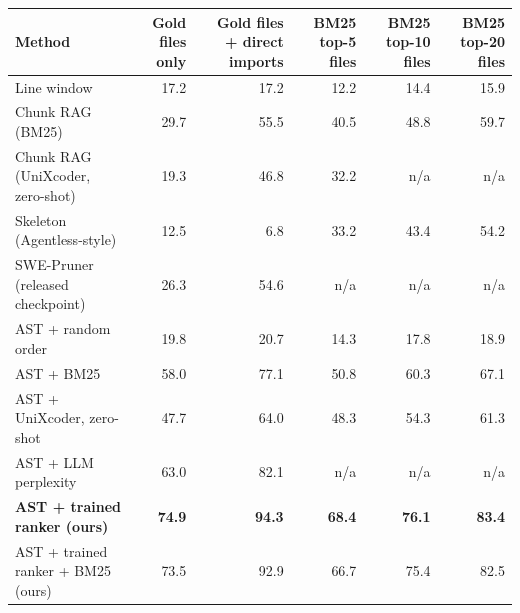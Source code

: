 \begin{tabular}{lrrrrr}
\toprule
Method & Gold files only & Gold files + direct imports & BM25 top-5 files & BM25 top-10 files & BM25 top-20 files \\
\midrule
Line window & 17.2 & 17.2 & 12.2 & 14.4 & 15.9 \\
Chunk RAG (BM25) & 29.7 & 55.5 & 40.5 & 48.8 & 59.7 \\
Chunk RAG (UniXcoder, zero-shot) & 19.3 & 46.8 & 32.2 & n/a & n/a \\
Skeleton (Agentless-style) & 12.5 & 6.8 & 33.2 & 43.4 & 54.2 \\
SWE-Pruner (released checkpoint) & 26.3 & 54.6 & n/a & n/a & n/a \\
AST + random order & 19.8 & 20.7 & 14.3 & 17.8 & 18.9 \\
AST + BM25 & 58.0 & 77.1 & 50.8 & 60.3 & 67.1 \\
AST + UniXcoder, zero-shot & 47.7 & 64.0 & 48.3 & 54.3 & 61.3 \\
AST + LLM perplexity & 63.0 & 82.1 & n/a & n/a & n/a \\
\textbf{AST + trained ranker (ours)} & \textbf{74.9} & \textbf{94.3} & \textbf{68.4} & \textbf{76.1} & \textbf{83.4} \\
AST + trained ranker + BM25 (ours) & 73.5 & 92.9 & 66.7 & 75.4 & 82.5 \\
\bottomrule
\end{tabular}
